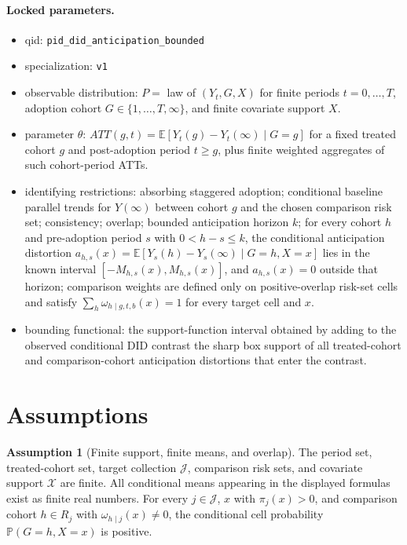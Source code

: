 \documentclass[11pt]{article}
\newcommand{\E}{\mathbb{E}}
\renewcommand{\Pr}{\mathbb{P}}
\theoremstyle{definition}
\newtheorem{assumption}{Assumption}
\theoremstyle{plain}
\theoremstyle{remark}
\begin{document}
\paragraph{Locked parameters.}
\begin{itemize}[leftmargin=*]
  \item qid: \texttt{pid\_did\_anticipation\_bounded}
  \item specialization: \texttt{v1}
  \item observable distribution: \(P=\) law of \((Y_t,G,X)\) for finite periods \(t=0,\ldots,T\), adoption cohort \(G\in\{1,\ldots,T,\infty\}\), and finite covariate support \(X\).
  \item parameter \(\theta\): \(ATT(g,t)=\E[Y_t(g)-Y_t(\infty)\mid G=g]\) for a fixed treated cohort \(g\) and post-adoption period \(t\ge g\), plus finite weighted aggregates of such cohort-period ATTs.
  \item identifying restrictions: absorbing staggered adoption; conditional baseline parallel trends for \(Y(\infty)\) between cohort \(g\) and the chosen comparison risk set; consistency; overlap; bounded anticipation horizon \(k\); for every cohort \(h\) and pre-adoption period \(s\) with \(0<h-s\le k\), the conditional anticipation distortion \(a_{h,s}(x)=\E[Y_s(h)-Y_s(\infty)\mid G=h,X=x]\) lies in the known interval \([-M_{h,s}(x),M_{h,s}(x)]\), and \(a_{h,s}(x)=0\) outside that horizon; comparison weights are defined only on positive-overlap risk-set cells and satisfy \(\sum_h\omega_{h\mid g,t,b}(x)=1\) for every target cell and \(x\).
  \item bounding functional: the support-function interval obtained by adding to the observed conditional DID contrast the sharp box support of all treated-cohort and comparison-cohort anticipation distortions that enter the contrast.
\end{itemize}

\section{Assumptions}
\begin{assumption}[Finite support, finite means, and overlap]\label{ass:finite-overlap}
The period set, treated-cohort set, target collection \(\mathcal{J}\), comparison
risk sets, and covariate support \(\mathcal{X}\) are finite.  All conditional
means appearing in the displayed formulas exist as finite real numbers.  For
every \(j\in\mathcal{J}\), \(x\) with \(\pi_j(x)>0\), and comparison cohort
\(h\in R_j\) with \(\omega_{h\mid j}(x)\ne0\), the conditional cell probability
\(\Pr(G=h,X=x)\) is positive.
\end{assumption}
\end{document}
